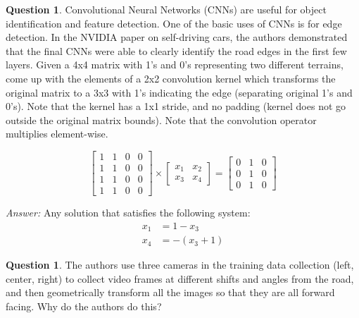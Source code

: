 \documentclass{article}
\theoremstyle{definition}
\newtheorem{question}[thm]{Question}
\newenvironment{answer}{\noindent\textit{Answer:}}{}
\begin{document}
\begin{question}
Convolutional Neural Networks (CNNs) are useful for object identification and feature detection. One of the basic uses of CNNs is for edge detection. In the NVIDIA paper on self-driving cars, the authors demonstrated that the final CNNs were able to clearly identify the road edges in the first few layers. Given a 4x4 matrix with 1’s and 0’s representing two different terrains, come up with the elements of a 2x2 convolution kernel which transforms the original matrix to a 3x3 with 1’s indicating the edge (separating original 1’s and 0’s). Note that the kernel has a 1x1 stride, and no padding (kernel does not go outside the original matrix bounds). Note that the convolution operator multiplies element-wise.

\begin{equation}
    \begin{bmatrix}
        1 & 1 & 0 & 0 \\
        1 & 1 & 0 & 0 \\
        1 & 1 & 0 & 0 \\
        1 & 1 & 0 & 0
    \end{bmatrix} \times 
    \begin{bmatrix}
        x_1 & x_2 \\
        x_3 & x_4
    \end{bmatrix} = 
    \begin{bmatrix}
        0 & 1 & 0 \\
        0 & 1 & 0 \\
        0 & 1 & 0
    \end{bmatrix}
\end{equation}
\end{question}

\begin{answer}
Any solution that satisfies the following system:
\begin{align}
    x_1 &= 1-x_3 \\
    x_4 &=-(x_3+1)
\end{align}
\end{answer}

\begin{question}
The authors use three cameras in the training data collection (left, center, right) to collect video frames at different shifts and angles from the road, and then geometrically transform all the images so that they are all forward facing. Why do the authors do this?
\end{question}
\end{document}
